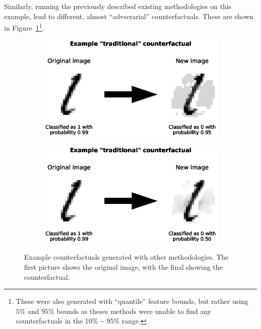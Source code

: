 \documentclass{article}
\begin{document}
Similarly, running the previously described existing methodologies on this example, lead to different, almost ``advserarial'' counterfactuals. These are shown in Figure~\ref{figure:mnist_counterfactuals_other}\footnote{These were also generated with ``quantile'' feature bounds, but rather using \(5\%\) and \(95\%\) bounds as theses methods were unable to find any counterfactuals in the \(10\%-95\%\) range.}.

\begin{figure}
    \centering
    \begin{subfigure}{\linewidth}
        \centering
        \includegraphics[width=\linewidth]{figures/mnist_counterfactual_trad_example.eps}
    \end{subfigure}
    \begin{subfigure}{\linewidth}
        \centering
        \includegraphics[width=\linewidth]{figures/mnist_counterfactual_proto_example.eps}
    \end{subfigure}
    \caption{Example counterfactuals generated with other methodologies. The first picture shows the original image, with the final showing the counterfactual.\label{figure:mnist_counterfactuals_other}}
\end{figure}
\end{document}
